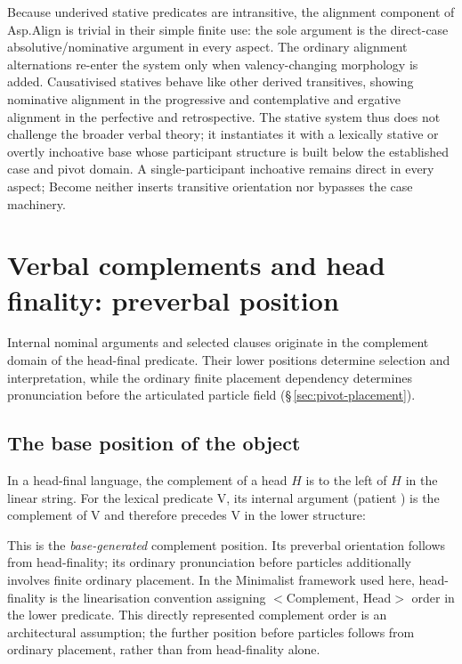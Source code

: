 Because underived stative predicates are intransitive, the alignment component
of Asp.Align is trivial in their simple finite use: the sole argument is the
direct-case absolutive/nominative argument in every aspect. The ordinary
alignment alternations re-enter the system only when valency-changing
morphology is added. Causativised statives behave like other derived
transitives, showing nominative alignment in the progressive and contemplative
and ergative alignment in the perfective and retrospective. The stative system
thus does not challenge the broader verbal theory; it instantiates it with a
lexically stative or overtly inchoative base whose participant structure is
built below the established case and pivot domain. A single-participant
inchoative remains direct in every aspect; Become neither inserts transitive
orientation nor bypasses the case machinery.


\section{Verbal complements and head finality: preverbal position}
\label{sec:vm-comp-headfinal}

Internal nominal arguments and selected clauses originate in the complement domain
of the head-final predicate. Their lower positions determine selection and
interpretation, while the ordinary finite placement dependency determines
pronunciation before the articulated particle field
(§\,\ref{sec:pivot-placement}).

\subsection{The base position of the object}
\label{sec:vm-obj-base}

In a head-final language, the complement of a head $H$ is to the
left of $H$ in the linear string. For the lexical predicate V, its
internal argument (patient ) is the complement of V and therefore
precedes V in the lower structure:

\begin{center}
\end{center}

\noindent This is the \emph{base-generated} complement position. Its
preverbal orientation follows from head-finality; its ordinary pronunciation
before particles additionally involves finite ordinary placement. In the Minimalist
framework used here, head-finality is the linearisation convention assigning
$<$Complement, Head$>$ order in the lower predicate. This directly represented
complement order is an architectural assumption; the further position before
particles follows from ordinary placement, rather than from head-finality
alone.

